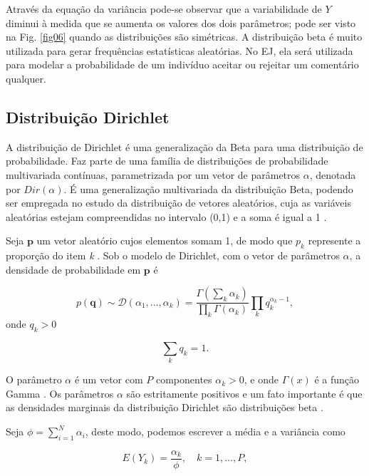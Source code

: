 Através da equação da variância pode-se observar que a variabilidade de $Y$ diminui à medida que se aumenta os valores dos dois parâmetros; pode ser visto na Fig. \ref{fig06} quando as distribuições são simétricas. A distribuição beta é muito utilizada para gerar frequências estatísticas aleatórias. No EJ, ela será utilizada para modelar a probabilidade de um indivíduo aceitar ou rejeitar um comentário qualquer.


\subsection{Distribuição Dirichlet}


A distribuição de Dirichlet é uma generalização da Beta para uma distribuição de probabilidade. Faz parte de uma família de distribuições de probabilidade multivariada contínuas, parametrizada por um vetor de parâmetros $\alpha$, denotada por $Dir(\alpha)$. É uma generalização multivariada da distribuição Beta, podendo ser empregada no estudo da distribuição de vetores aleatórios, cuja as variáveis aleatórias estejam compreendidas no intervalo (0,1) e a soma é igual a 1 .

Seja $\textbf{p}$ um vetor aleatório cujos elementos somam 1, de modo que $p_{k}$ represente a proporção do item \textit{k} \cite{minka2000}. Sob o modelo de Dirichlet, com o vetor de parâmetros $\alpha$, a densidade de probabilidade em $\textbf{p}$ é

\begin{equation}
p(\boldsymbol {q}) \sim \mathcal{D}(\alpha_{1},\dots,\alpha_{k}) = \frac {\Gamma(\sum_{k} \alpha_{k})}{\prod_{k}\Gamma(\alpha_{k})} \prod_{k} q_{k}^{\alpha_{k}-1},
\end{equation}
%
onde $q_{k} > 0$ 

\begin{equation}
\sum_{k} q_{k} = 1.
\end{equation}    

O parâmetro $\alpha$ é um vetor com $P$ componentes $\alpha_k > 0$, e onde $\Gamma(x)$ é a função Gamma \cite{blei2003}.
Os parâmetros $\alpha$ são estritamente positivos e um fato importante é que as densidades marginais da distribuição Dirichlet são distribuições beta \cite{gomes2005}.

Seja $\phi = \sum_{i=1}^{N} \alpha_i$, deste modo, podemos escrever a média e a variância como 


\begin{equation}
E(Y_k) = \frac{\alpha_k}{\phi}, \quad k = 1, \dots, P,
\end{equation} 

